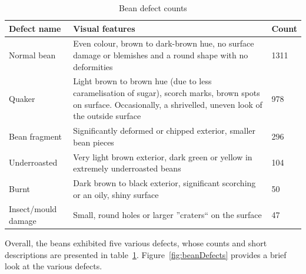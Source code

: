 \begin{table}[h]
    \centering
    \begin{tabular}{p{}p{}p{}}
        \toprule \textbf{Defect name} & \textbf{Visual features}                                                                                   & \textbf{Count} \\
        \midrule Normal bean          & Even colour, brown to dark-brown hue, no surface damage or blemishes and a round shape with no deformities                                                           & 1311           \\
        Quaker & Light brown to brown hue (due to less caramelisation of sugar), scorch marks, brown spots on surface.
        Occasionally, a shrivelled, uneven look of the outside surface & 978            \\
        Bean fragment                 & Significantly deformed or chipped exterior, smaller bean pieces                                            & 296            \\
        Underroasted                  & Very light brown exterior, dark green or yellow in extremely underroasted beans                                                                                      & 104            \\
        Burnt                         & Dark brown to black exterior, significant scorching or an oily, shiny surface                                                                                        & 50             \\
        Insect/mould damage           & Small, round holes or larger ''craters`` on the surface                                                    & 47             \\
        \bottomrule
    \end{tabular}
    \caption{Bean defect counts}
    \label{tab:beanDefectCounts}
\end{table}
Overall, the beans exhibited five various defects, whose
counts and short descriptions are presented in table~\ref{tab:beanDefectCounts}.
Figure~\ref{fig:beanDefects} provides a brief look at the various defects.

